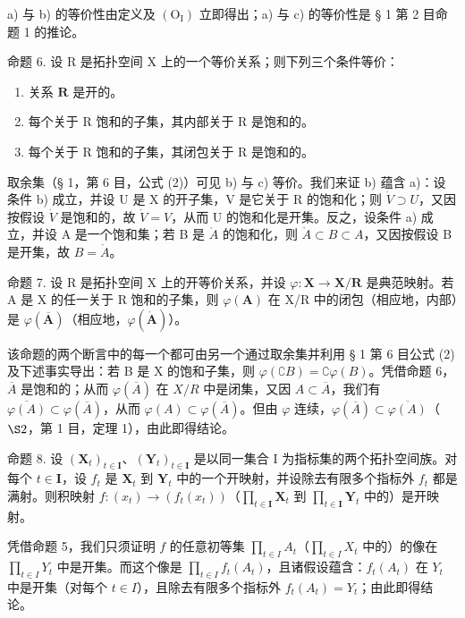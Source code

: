 a) 与 b) 的等价性由定义及 \((\mathrm{O}_{\mathrm{I}})\) 立即得出；a) 与 c) 的等价性是 § 1 第 2 目命题 1 的推论。

命题 6. 设 R 是拓扑空间 X 上的一个等价关系；则下列三个条件等价：

\begin{enumerate}
\def\labelenumi{\alph{enumi})}
\item
  关系 \(\mathbf{R}\) 是开的。
\item
  每个关于 R 饱和的子集，其内部关于 R 是饱和的。
\item
  每个关于 R 饱和的子集，其闭包关于 R 是饱和的。
\end{enumerate}

取余集（§ 1，第 6 目，公式 (2)）可见 b) 与 c) 等价。我们来证 b) 蕴含 a)：设条件 b) 成立，并设 U 是 X 的开子集，V 是它关于 R 的饱和化；则 \(\dot{V} \supset U\)，又因按假设 \(\dot{V}\) 是饱和的，故 \(\dot{V} = V\)，从而 U 的饱和化是开集。反之，设条件 a) 成立，并设 A 是一个饱和集；若 B 是 \(\mathring{A}\) 的饱和化，则 \(\mathring{A} \subset B \subset A\)，又因按假设 B 是开集，故 \(B = \mathring{A}\)。

命题 7. 设 R 是拓扑空间 X 上的开等价关系，并设 \(\varphi: \mathbf{X} \to \mathbf{X}/\mathbf{R}\) 是典范映射。若 A 是 X 的任一关于 R 饱和的子集，则 \(\varphi(\mathbf{A})\) 在 X/R 中的闭包（相应地，内部）是 \(\varphi(\overline{\mathbf{A}})\)（相应地，\(\varphi(\mathring{\mathbf{A}})\)）。

该命题的两个断言中的每一个都可由另一个通过取余集并利用 § 1 第 6 目公式 (2) 及下述事实导出：若 B 是 X 的饱和子集，则 \(\varphi(\complement B) = \complement \varphi(B)\)。凭借命题 6，\(\overline{A}\) 是饱和的；从而 \(\varphi(\overline{A})\) 在 \(X/R\) 中是闭集，又因 \(A \subset \overline{A}\)，我们有 \(\overline{\varphi(A)} \subset \varphi(\overline{A})\)，从而 \(\varphi(A) \subset \varphi(\overline{A})\)。但由 \(\varphi\) 连续，\(\varphi(\overline{A}) \subset \overline{\varphi(A)}\)（\(\S 2\)，第 1 目，定理 1），由此即得结论。

命题 8. 设 \((\mathbf{X}_t)_{t \in \mathbf{I}}\)、\((\mathbf{Y}_t)_{t \in \mathbf{I}}\) 是以同一集合 I 为指标集的两个拓扑空间族。对每个 \(t \in \mathbf{I}\)，设 \(f_t\) 是 \(\mathbf{X}_t\) 到 \(\mathbf{Y}_t\) 中的一个开映射，并设除去有限多个指标外 \(f_t\) 都是满射。则积映射 \(f: (x_t) \to (f_t(x_t))\)（\(\prod_{t \in \mathbf{I}} \mathbf{X}_t\) 到 \(\prod_{t \in \mathbf{I}} \mathbf{Y}_t\) 中的）是开映射。

凭借命题 5，我们只须证明 \(f\) 的任意初等集 \(\prod_{t \in I} A_t\)（\(\prod_{t \in I} X_t\) 中的）的像在 \(\prod_{t \in I} Y_t\) 中是开集。而这个像是 \(\prod_{t \in I} f_t(A_t)\)，且诸假设蕴含：\(f_t(A_t)\) 在 \(Y_t\) 中是开集（对每个 \(t \in I\)），且除去有限多个指标外 \(f_t(A_t) = Y_t\)；由此即得结论。

